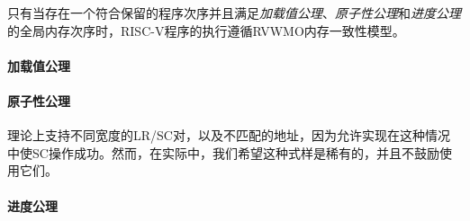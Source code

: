 只有当存在一个符合保留的程序次序并且满足{\em 加载值公理}、{\em 原子性公理}和{\em 进度公理}的全局内存次序时，RISC-V程序的执行遵循RVWMO内存一致性模型。




\paragraph{加载值公理}
\label{rvwmo:ax:load}
\loadvalueaxiom

\paragraph{原子性公理}
\label{rvwmo:ax:atom}
\atomicityaxiom

\begin{commentary}
  理论上支持不同宽度的LR/SC对，以及不匹配的地址，因为允许实现在这种情况中使SC操作成功。然而，在实际中，我们希望这种式样是稀有的，并且不鼓励使用它们。
\end{commentary}

\paragraph{进度公理}
\label{rvwmo:ax:prog}
\progressaxiom



